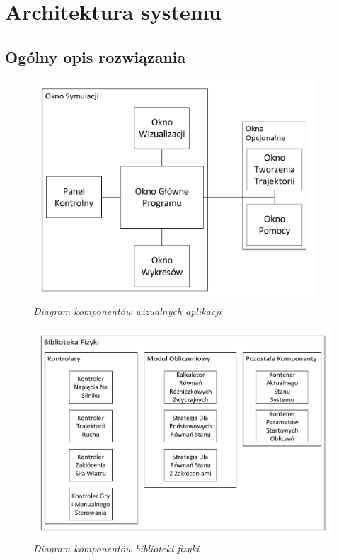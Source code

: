 \documentclass[12pt, oneside]{report}
\theoremstyle{definition}
\begin{document}
\chapter{Architektura systemu}
\section{Ogólny opis rozwiązania}

\begin{figure}[H]
	\centering
		\includegraphics[width = 300pt]{SystemVisual} 
		\caption{\textit{Diagram komponentów wizualnych aplikacji}}
		\label{SystemVisual}
\end{figure}

\begin{figure}[H]
	\centering
		\includegraphics[width = 350pt]{Library} 
		\caption{\textit{Diagram komponentów biblioteki fizyki}}
		\label{Library}
\end{figure}
\end{document}
